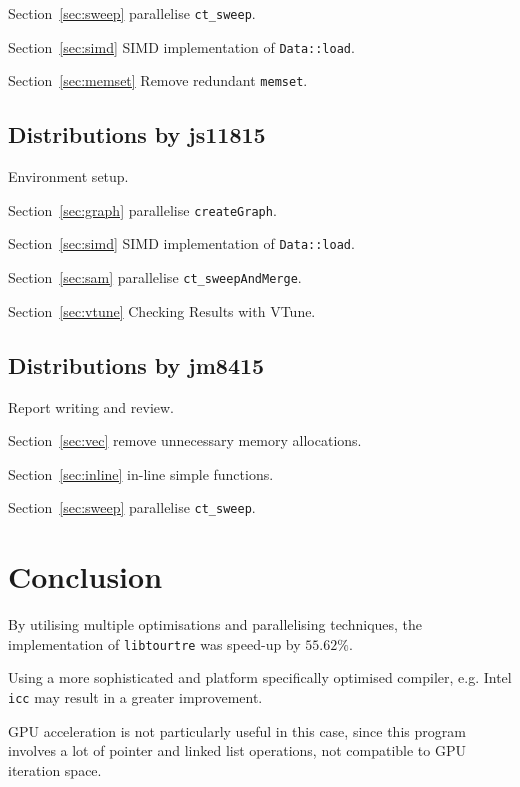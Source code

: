 \documentclass[conference]{IEEEtran}
\newcommand{\sref}[1]{Section~\ref{#1}}
\begin{document}
\sref{sec:sweep} parallelise \texttt{ct\_sweep}.

\sref{sec:simd} SIMD implementation of \texttt{Data::load}.

\sref{sec:memset} Remove redundant \texttt{memset}.


\subsection{Distributions by js11815}

Environment setup.

\sref{sec:graph} parallelise \texttt{createGraph}.

\sref{sec:simd} SIMD implementation of \texttt{Data::load}.

\sref{sec:sam} parallelise \texttt{ct\_sweepAndMerge}.

\sref{sec:vtune} Checking Results with VTune.


\subsection{Distributions by jm8415}

Report writing and review.

\sref{sec:vec} remove unnecessary memory allocations.

\sref{sec:inline} in-line simple functions.

\sref{sec:sweep} parallelise \texttt{ct\_sweep}.

\section{Conclusion}

By utilising multiple optimisations and parallelising techniques, the implementation of \texttt{libtourtre} was speed-up by $55.62 \%$.

Using a more sophisticated and platform specifically optimised compiler, e.g. Intel \texttt{icc} may result in a greater improvement.

GPU acceleration is not particularly useful in this case, since this program involves a lot of pointer and linked list operations, not compatible to GPU iteration space.



\end{document}
